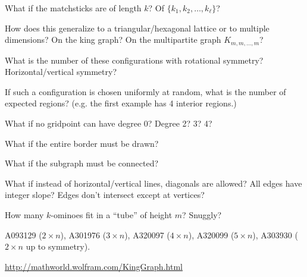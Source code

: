 \documentclass{article}
\begin{document}
\begin{related}
  \item What if the matchsticks are of length $k$? Of $\{k_1,k_2, \hdots, k_\ell\}$?
  \item How does this generalize to a triangular/hexagonal lattice or to
    multiple dimensions? On the king graph? On the multipartite graph $K_{m,m,\hdots,m}$?
  \item What is the number of these configurations with rotational symmetry?
    Horizontal/vertical symmetry?
  \item If such a configuration is chosen uniformly at random, what is the
    number of expected regions? (e.g. the first example has 4 interior
    regions.)
  \item What if no gridpoint can have degree 0? Degree 2? 3? 4?
  \item What if the entire border must be drawn?
  \item What if the subgraph must be connected?
  \item What if instead of horizontal/vertical lines, diagonals are allowed?
    All edges have integer slope?
    Edges don't intersect except at vertices?
  \item How many $k$-ominoes fit in a ``tube'' of height $m$? Snuggly?
\end{related}
\begin{references}
  \item A093129 ($2 \times n$), A301976 ($3 \times n$), A320097 ($4 \times n$),
    A320099 ($5 \times n$), A303930 ($2 \times n$ up to symmetry).
  \item \url{http://mathworld.wolfram.com/KingGraph.html}
\end{references}
\end{document}
